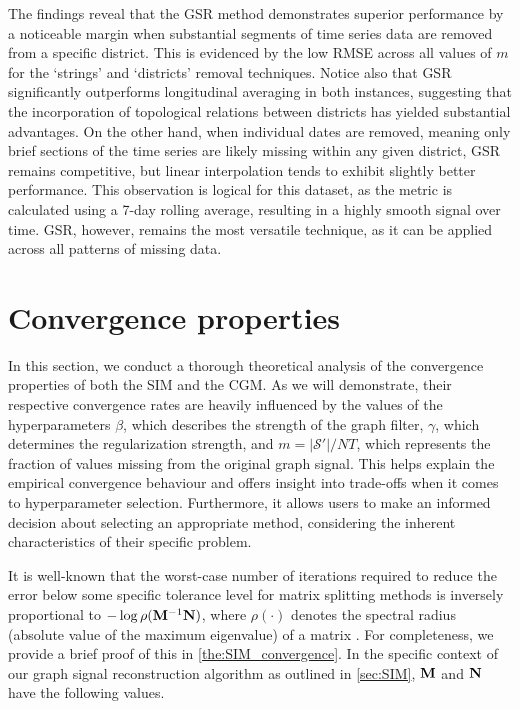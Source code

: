 The findings reveal that the GSR method demonstrates superior performance by a noticeable margin when substantial segments of time series data are removed from a specific district. This is evidenced by the low RMSE across all values of $m$ for the `strings' and `districts' removal techniques. Notice also that GSR significantly outperforms longitudinal averaging in both instances, suggesting that the incorporation of topological relations between districts has yielded substantial advantages. On the other hand, when individual dates are removed, meaning only brief sections of the time series are likely missing within any given district, GSR remains competitive, but linear interpolation tends to exhibit slightly better performance. This observation is logical for this dataset, as the metric is calculated using a 7-day rolling average, resulting in a highly smooth signal over time. GSR, however, remains the most versatile technique, as it can be applied across all patterns of missing data. 

 
\section{Convergence properties}

\label{sec:convergence}

In this section, we conduct a thorough theoretical analysis of the convergence properties of both the SIM and the CGM. As we will demonstrate, their respective convergence rates are heavily influenced by the values of the hyperparameters $\beta$, which describes the strength of the graph filter, $\gamma$, which determines the regularization strength, and $m=|\mathcal{S}'|/NT$, which represents the fraction of values missing from the original graph signal. This helps explain the empirical convergence behaviour and offers insight into trade-offs when it comes to hyperparameter selection. Furthermore, it allows users to make an informed decision about selecting an appropriate method, considering the inherent characteristics of their specific problem. 

It is well-known that the worst-case number of iterations required to reduce the error below some specific tolerance level for matrix splitting methods is inversely proportional to $-\log \rho(\mathbf{M}^{-1}\mathbf{N})$, where $\rho(\cdot)$ denotes the spectral radius (absolute value of the maximum eigenvalue) of a matrix \citep{Demmel1997}. For completeness, we provide a brief proof of this in \cref{the:SIM_convergence}. In the specific context of our graph signal reconstruction algorithm as outlined in \cref{sec:SIM}, $\mathbf{M}$ and $\mathbf{N}$ have the following values.  


